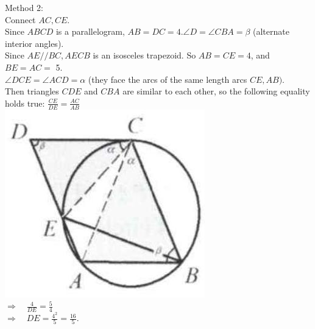 \documentclass{article}
\begin{document}
Method 2:\\
Connect \(A C, C E\).\\
Since \(A B C D\) is a parallelogram, \(A B=D C=4 . \angle D=\angle C B A=\beta\) (alternate interior angles).\\
Since \(A E / / B C, A E C B\) is an isosceles trapezoid. So \(A B=C E=4\), and \(B E=A C=\) 5.\\
\(\angle D C E=\angle A C D=\alpha\) (they face the arcs of the same length arcs \(C E, A B)\).\\
Then triangles \(C D E\) and \(C B A\) are similar to each other, so the following equality holds true: \(\frac{C E}{D E}=\frac{A C}{A B}\)\\
\centering
\includegraphics[width=\textwidth]{images/168.jpg}\\
\(\Rightarrow \quad \frac{4}{D E}=\frac{5}{4}\)\\
\(\Rightarrow \quad D E=\frac{4^{2}}{5}=\frac{16}{5}\).
\end{document}
